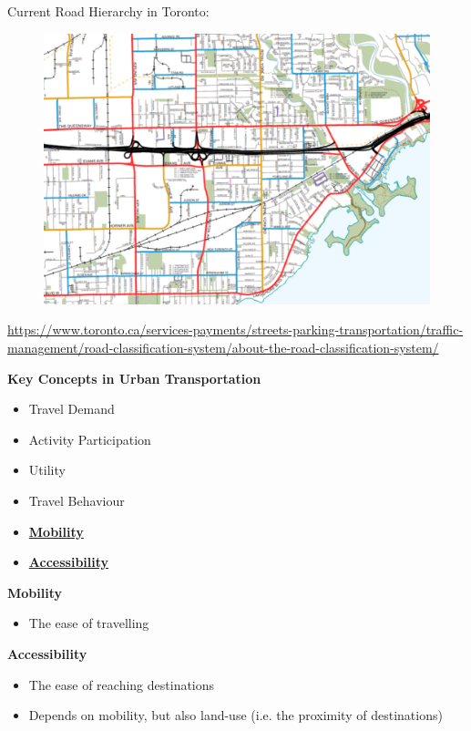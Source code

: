 \documentclass[aspectratio=169]{beamer}
\begin{document}
\begin{frame}
	
	Current Road Hierarchy in Toronto:
	
	\begin{figure}
		\centering
		\includegraphics[width=0.85\linewidth]{images/tor_road_heir.png}
		
	\end{figure}
	\tiny{\url{https://www.toronto.ca/services-payments/streets-parking-transportation/traffic-management/road-classification-system/about-the-road-classification-system/}}
	
\end{frame}





\begin{frame}
	\textbf{Key Concepts in Urban Transportation}
	\normalsize
	\vspace{4mm}
	\begin{itemize}
		\item Travel Demand
		\item Activity Participation
		\item Utility
		\item Travel Behaviour
		\item \textbf{\underline{Mobility}}
		\item \textbf{\underline{Accessibility}}
	\end{itemize}
\end{frame}



\begin{frame}
	
	\textbf{Mobility}
	\begin{itemize}
		\item The ease of travelling
	\end{itemize}

	\textbf{Accessibility}
	\begin{itemize}
		\item The ease of reaching destinations
		\item Depends on mobility, but also land-use (i.e. the proximity of destinations)
	\end{itemize}
	
\end{frame}
\end{document}
